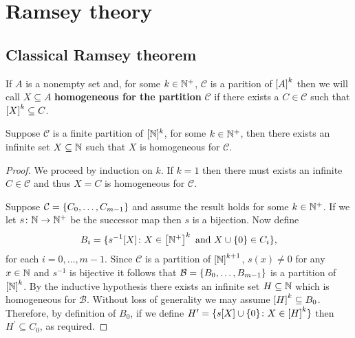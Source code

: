 

\chapter{Ramsey theory}


\section{Classical Ramsey theorem}


    \begin{dfn}
       If $A$ is a nonempty set and, for some $k\in\posnats$, $\mathcal{C}$ is a parition of $\subsets{k}{A}$ then we will call $X\subseteq A$ \textbf{homogeneous for the partition} $\mathcal{C}$ if there exists a $C\in \mathcal{C}$ such that $\subsets{k}{X}\subseteq C$.
    \end{dfn}

    \begin{thm}
        Suppose $\mathcal{C}$ is a finite partition of $[\nats]^k$, for some $k\in\posnats$, then there exists an infinite set $X\subseteq\nats$ such that $X$ is homogeneous for $\mathcal{C}$.
    \end{thm}
    \begin{proof}
        We proceed by induction on $k$. If $k=1$ then there must exists an infinite $C\in\mathcal{C}$ and thus $X=C$ is homogeneous for $\mathcal{C}$.

        Suppose $\mathcal{C}=\set{C_0,\dotsc,C_{m-1}}$ and assume the result holds for some $k\in\posnats$. If we let $s\colon\nats\to\posnats$ be the successor map then $s$ is a bijection.  Now define
        \begin{equation}
            B_i=\setbuild{s^{-1}[X]}{X\in\subsets{k}{\posnats}\text{ and }X\cup\set{0}\in C_i},
        \end{equation}
        for each $i=0,\dotsc,m-1$.  Since $\mathcal{C}$ is a partition of $\subsets{k+1}{\nats}$, $s(x)\neq 0$ for any $x\in\nats$ and $s^{-1}$ is bijective it follows that $\mathcal{B}=\set{B_0,\dotsc,B_{m-1}}$ is a partition of $\subsets{k}{\nats}$.  By the inductive hypothesis there exists an infinite set $H\subseteq\nats$ which is homogeneous for $\mathcal{B}$.  Without loss of generality we may assume $\subsets{k}{H}\subseteq B_0$.  Therefore, by definition of $B_0$, if we define $H^\prime=\setbuild{s[X]\cup\set{0}}{X\in\subsets{k}{H}}$ then $H^\prime\subseteq C_0$, as required.
    \end{proof}

